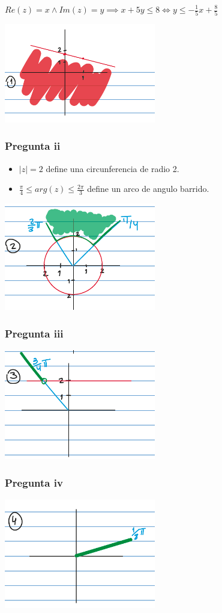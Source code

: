 $ Re(z) = x \wedge Im(z) = y \implies x+5y \leq 8 \iff y \leq -\frac{1}{5}x + \frac{8}{5}$

\includegraphics[width=250px]{6.5.1}

\subsubsection{Pregunta ii}

\begin{itemize}
    \item $ |z| = 2 $ define una circunferencia de radio 2.
    \item $ \frac{\pi}{4} \leq arg(z) \leq \frac{2\pi}{3} $ define un arco de angulo barrido.
\end{itemize}

\includegraphics[width=250px]{6.5.2}

\subsubsection{Pregunta iii}
\includegraphics[width=250px]{6.5.3}

\subsubsection{Pregunta iv}
\includegraphics[width=250px]{6.5.4}

